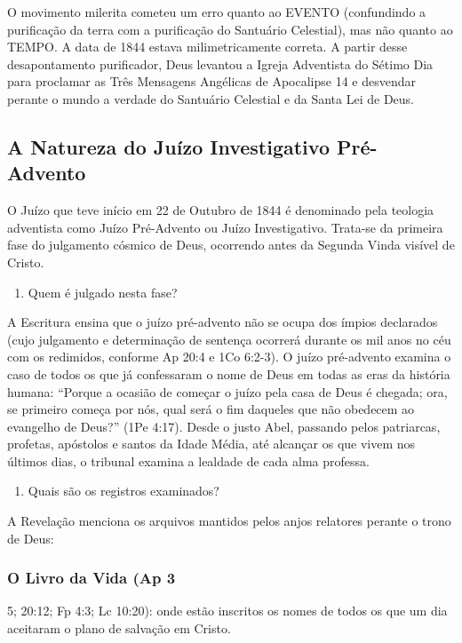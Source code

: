O movimento milerita cometeu um erro quanto ao EVENTO (confundindo a purificação da terra com a purificação do Santuário Celestial), mas não quanto ao TEMPO. A data de 1844 estava milimetricamente correta. A partir desse desapontamento purificador, Deus levantou a Igreja Adventista do Sétimo Dia para proclamar as Três Mensagens Angélicas de Apocalipse 14 e desvendar perante o mundo a verdade do Santuário Celestial e da Santa Lei de Deus.



\subsection{A Natureza do Juízo Investigativo Pré-Advento}


O Juízo que teve início em 22 de Outubro de 1844 é denominado pela teologia adventista como Juízo Pré-Advento ou Juízo Investigativo. Trata-se da primeira fase do julgamento cósmico de Deus, ocorrendo antes da Segunda Vinda visível de Cristo.

\begin{enumerate}
  \item Quem é julgado nesta fase?
\end{enumerate}

A Escritura ensina que o juízo pré-advento não se ocupa dos ímpios declarados (cujo julgamento e determinação de sentença ocorrerá durante os mil anos no céu com os redimidos, conforme Ap 20:4 e 1Co 6:2-3). O juízo pré-advento examina o caso de todos os que já confessaram o nome de Deus em todas as eras da história humana:
``Porque a ocasião de começar o juízo pela casa de Deus é chegada; ora, se primeiro começa por nós, qual será o fim daqueles que não obedecem ao evangelho de Deus?'' (1Pe 4:17).
Desde o justo Abel, passando pelos patriarcas, profetas, apóstolos e santos da Idade Média, até alcançar os que vivem nos últimos dias, o tribunal examina a lealdade de cada alma professa.

\begin{enumerate}
  \item Quais são os registros examinados?
\end{enumerate}

A Revelação menciona os arquivos mantidos pelos anjos relatores perante o trono de Deus:

\subsubsection*{O Livro da Vida (Ap 3}
5; 20:12; Fp 4:3; Lc 10:20): onde estão inscritos os nomes de todos os que um dia aceitaram o plano de salvação em Cristo.

